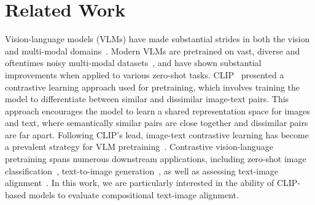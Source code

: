 \section{Related Work}
Vision-language models (VLMs) have made substantial strides in both the vision and multi-modal domains~\citep{bordes2024introduction}. Modern VLMs are pretrained on vast, diverse and oftentimes noisy multi-modal datasets~\citep{changpinyo2021cc12m,schuhmann2022laion5bopenlargescaledataset,ilharco2021openclip, zeng2022multigrainedvisionlanguagepretraining}, and have shown substantial improvements when applied to various zero-shot tasks. CLIP~\citep{radford2021learning} presented a contrastive learning approach used for pretraining, which involves training the model to differentiate between similar and dissimilar image-text pairs. This approach encourages the model to learn a shared representation space for images and text, where semantically similar pairs are close together and dissimilar pairs are far apart. Following CLIP's lead, image-text contrastive learning has become a prevalent strategy for VLM pretraining~\citep{liu2023llava,cai2023vipllava,liu2024llavanext, dai2023instructblipgeneralpurposevisionlanguagemodels, zhai2022litzeroshottransferlockedimage, chen2022pali, beyer2024paligemmaversatile3bvlm, finiimproved}. Contrastive vision-language pretraining spans numerous downstream applications, including zero-shot image classification~\citep{zhai2022lit,radford2021learning, metzen2024autoclipautotuningzeroshotclassifiers,gao2021clipadapterbettervisionlanguagemodels},  text-to-image generation~\citep{podell2023sdxlimprovinglatentdiffusion,abdal2021clip2styleganunsupervisedextractionstylegan, ramesh2022hierarchical,saharia2022photorealistic}, as well as assessing text-image alignment~\citep{hessel-etal-2021-clipscore, cho2023finegrainedimagecaptioningclip}. In this work, we are particularly interested in the ability of CLIP-based models to evaluate compositional text-image alignment.

\iffalse
Contrastive-Language Image Pretraining (CLIP)~\citep{radford2021learning} models are trained by defining an image and its corresponding caption as positive pairs while the same image and all the other captions present in a mini-batch are defined as negative pairs. By discriminating the positive pair from the negative one, CLIP models can learn an alignment between visual clues in images and text. Despite having impressive results on zero-shot object detection tasks, such approach has been shown to be limited in learning more abstract concepts such as relations between objects or attributes~\citep{kamath2023whatsupvisionlanguagemodels, yuksekgonul2023visionlanguagemodelsbehavelike}.
\fi


